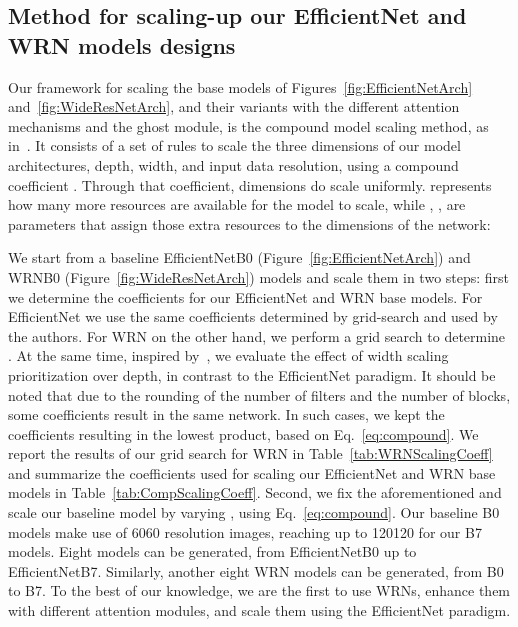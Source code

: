 \documentclass[journal]{IEEEtran}
\begin{document}
\subsection{Method for scaling-up our EfficientNet and WRN models designs}
\label{sec:scaleup}


Our framework for scaling the base models of Figures~\ref{fig:EfficientNetArch} and~\ref{fig:WideResNetArch}, and their variants with the different attention mechanisms and the ghost module, is the compound model scaling method, as in~\cite{pmlr-v97-tan19a}. It consists of a set of rules to scale the three dimensions of our model architectures, depth, width, and input data resolution, using a compound coefficient . Through that coefficient, dimensions do scale uniformly.  represents how many more resources are available for the model to scale, while , ,  are parameters that assign those extra resources to the dimensions of the network: 





 We start from a baseline EfficientNetB0 (Figure~\ref{fig:EfficientNetArch}) and WRNB0 (Figure~\ref{fig:WideResNetArch}) models and scale them in two steps: first we determine the  coefficients for our EfficientNet and WRN base models. For EfficientNet we use the same coefficients determined by grid-search and used by the authors. For WRN on the other hand, we perform a grid search to determine . At the same time, inspired by~\cite{bello2021revisiting}, we evaluate the effect of width scaling prioritization over depth, in contrast to the EfficientNet paradigm. It should be noted that due to the rounding of the number of filters and the number of blocks, some coefficients result in the same network. In such cases, we kept the coefficients resulting in the lowest  product, based on Eq.~\ref{eq:compound}. We report the results of our grid search for WRN in Table~\ref{tab:WRNScalingCoeff} and summarize the coefficients used for scaling our EfficientNet and WRN base models in Table~\ref{tab:CompScalingCoeff}.
Second, we fix the aforementioned  and scale our baseline model by varying , using Eq.~\ref{eq:compound}. Our baseline B0 models make use of 6060 resolution images, reaching up to 120120 for our B7 models. Eight models can be generated, from EfficientNetB0 up to EfficientNetB7. Similarly, another eight WRN models can be generated, from B0 to B7. To the best of our knowledge, we are the first to use WRNs, enhance them with different attention modules, and scale them using the EfficientNet paradigm.
\end{document}
